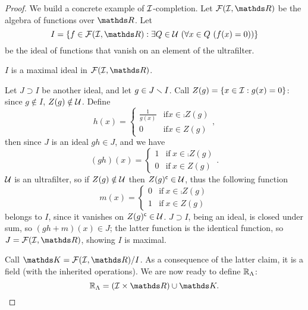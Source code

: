 \documentclass[draft.tex]{subfiles}
\begin{document}
\begin{proof}
We build a concrete example of $\mathcal{I}$-completion. Let $\cl{F}(\cl{I},\RR)$ be the algebra of functions over $\RR$. Let
\begin{equation*}
    I = \{f \in \cl{F}(\cl{I},\RR): \exists Q \in \cl{U} \ (\forall x \in Q \ (f(x) = 0))\}
\end{equation*}
be the ideal of functions that vanish on an element of the ultrafilter.
\begin{claim}
$I$ is a maximal ideal in $\cl{F}(\cl{I}, \RR)$.
\end{claim}
Let $J \supset I$ be another ideal, and let $g \in J \smallsetminus I$. Call $Z(g) = \{x \in \mathcal{I}: g(x) = 0\}$: since $g \notin I$, $Z(g) \notin \mathcal{U}$. Define
\begin{equation*}
    h(x) = \begin{cases}
    \frac{1}{g(x)} & \text{if} x \in \comp{Z(g)} \\
    0 & \text{if} x \in Z(g)
    \end{cases},
\end{equation*}
then since $J$ is an ideal $gh \in J$, and we have
\begin{equation*}
    (gh)(x) = \begin{cases}
    1 & \text{if} \ x \in \comp{Z(g)} \\
    0 & \text{if} \ x \in Z(g)
    \end{cases}.
\end{equation*}
$\mathcal{U}$ is an ultrafilter, so if $Z(g) \notin \mathcal{U}$ then $Z(g)^{\mathsf{c}} \in \mathcal{U}$, thus the following function
\begin{equation*}
    m(x) = \begin{cases}
    0 & \text{if} \ x \in \comp{Z(g)} \\
    1 & \text{if} \ x \in Z(g)
    \end{cases}
\end{equation*}
belongs to $I$, since it vanishes on $Z(g)^{\mathsf{c}} \in \mathcal{U}$. $J \supset I$, being an ideal, is closed under sum, so $(gh+m)(x) \in J$; the latter function is the identical function, so $J = \cl{F}(\cl{I},\RR)$, showing $I$ is maximal.
\par Call $\struct{K} = \cl{F}(\cl{I},\RR) / I$. As a consequence of the latter claim, it is a field (with the inherited operations). We are now ready to define $\mathbb{R}_{\Lambda}$:
\begin{equation*}
    \completion = (\cl{I} \times \RR) \cup \struct{K}.
\end{equation*}

\end{proof}
\end{document}
